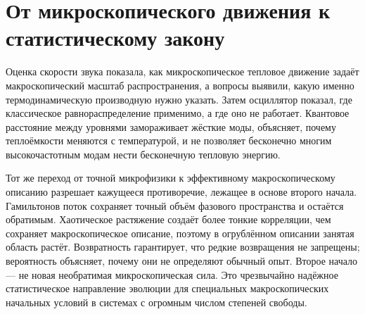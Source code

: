 \begin{classroomqa}
\end{classroomqa}

\begin{classroomqa}
\end{classroomqa}

\begin{classroomqa}
\end{classroomqa}

\section{От микроскопического движения к статистическому закону}

Оценка скорости звука показала, как микроскопическое тепловое движение задаёт макроскопический масштаб распространения, а вопросы выявили, какую именно термодинамическую производную нужно указать. Затем осциллятор показал, где классическое равнораспределение применимо, а где оно не работает. Квантовое расстояние между уровнями замораживает жёсткие моды, объясняет, почему теплоёмкости меняются с температурой, и не позволяет бесконечно многим высокочастотным модам нести бесконечную тепловую энергию.

Тот же переход от точной микрофизики к эффективному макроскопическому описанию разрешает кажущееся противоречие, лежащее в основе второго начала. Гамильтонов поток сохраняет точный объём фазового пространства и остаётся обратимым. Хаотическое растяжение создаёт более тонкие корреляции, чем сохраняет макроскопическое описание, поэтому в огрублённом описании занятая область растёт. Возвратность гарантирует, что редкие возвращения не запрещены; вероятность объясняет, почему они не определяют обычный опыт. Второе начало — не новая необратимая микроскопическая сила. Это чрезвычайно надёжное статистическое направление эволюции для специальных макроскопических начальных условий в системах с огромным числом степеней свободы.